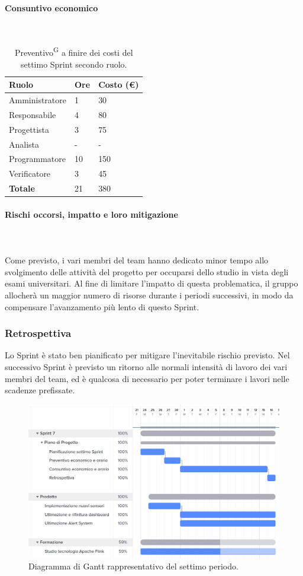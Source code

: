 \documentclass[8pt]{article}
\newcommand{\glossterm}[1]{#1\textsuperscript{G}} %
\newcommand{\subsubsubsection}[1]{\paragraph{#1}\mbox{}\\}
\begin{document}
\subsubsubsection{Consuntivo economico}
\begin{table}[ht!]
    \centering
    \begin{tabular}{p{4cm} p{1.8cm} p{2.2cm}}
        \toprule
        \textbf{Ruolo} & \textbf{Ore} & \textbf{Costo (€)} \\
        \midrule
        Amministratore & 1  & 30  \\
        Responsabile   & 4  & 80  \\
        Progettista    & 3  & 75  \\
        Analista       & -  & -   \\
        Programmatore  & 10 & 150 \\
        Verificatore   & 3  & 45  \\
        \midrule
        \textbf{Totale} & 21 & 380
    \end{tabular}
    \caption{\glossterm{Preventivo} a finire dei costi del settimo Sprint secondo ruolo.}
    \label{table:Preventivo a finire dei costi del settimo Sprint secondo ruolo}
\end{table}
\subsubsubsection{Rischi occorsi, impatto e loro mitigazione} \\
Come previsto, i vari membri del team hanno dedicato minor tempo allo svolgimento delle attività del progetto per occuparsi dello studio in vista degli esami universitari. Al fine di limitare l'impatto di questa problematica, il gruppo allocherà un maggior numero di risorse durante i periodi successivi, in modo da compensare l'avanzamento più lento di questo Sprint. 
\subsubsection{Retrospettiva}
Lo Sprint è stato ben pianificato per mitigare l'inevitabile rischio previsto. Nel successivo Sprint è previsto un ritorno alle normali intensità di lavoro dei vari membri del team, ed è qualcosa di necessario per poter terminare i lavori nelle scadenze prefissate.
\begin{figure}[h!]
    \centering
    \includegraphics[width=13cm]{./images_pdp/gantt7.png}
    \caption{Diagramma di Gantt rappresentativo del settimo periodo.}
\end{figure}
\clearpage
\newpage
\end{document}
